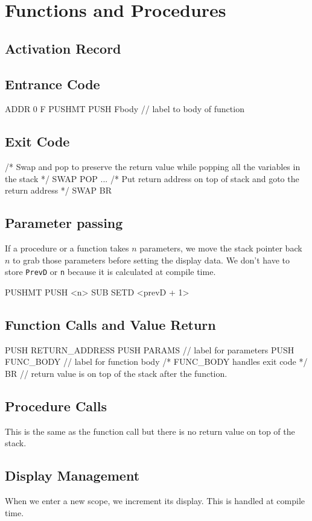 \section{Functions and Procedures}
\subsection{Activation Record}
\subsection{Entrance Code}

\begin{code}
ADDR 0 F
PUSHMT
PUSH Fbody // label to body of function
\end{code}
\subsection{Exit Code}

\begin{code}
/* 
Swap and pop to preserve the return value while 
popping all the variables in the stack
*/
SWAP
POP
...
/* 
Put return address on top of stack and goto 
the return address 
*/
SWAP
BR
\end{code}

\subsection{Parameter passing}
If a procedure or a function takes $n$ parameters, we move the stack pointer
back $n$ to grab those parameters before setting the display data. We don't have
to store \texttt{PrevD} or \texttt{n} because it is calculated at compile time.

\begin{code}
PUSHMT
PUSH <n>
SUB
SETD <prevD + 1>
\end{code}

\subsection{Function Calls and Value Return}

\begin{code}
PUSH RETURN_ADDRESS
PUSH PARAMS // label for parameters
PUSH FUNC_BODY // label for function body
/* FUNC_BODY handles exit code */  
BR // return value is on top of the stack after the function.
\end{code}

\subsection{Procedure Calls}
This is the same as the function call but there is no return value on top of the
stack.

\subsection{Display Management}
When we enter a new scope, we increment its display. This is handled at compile
time.
